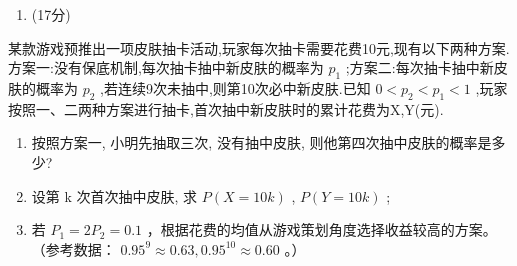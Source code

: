 \documentclass[UTF8,12pt,a4paper]{ctexart}
\renewcommand{\labelenumi}{\arabic{enumi}.}
\providecommand{\tightlist}{%
  \setlength{\itemsep}{0pt}\setlength{\parskip}{0pt}}
\begin{document}
\begin{enumerate}
\def\labelenumi{\arabic{enumi}.}
\setcounter{enumi}{18}
\tightlist
\item
  (17分)
\end{enumerate}

某款游戏预推出一项皮肤抽卡活动,玩家每次抽卡需要花费10元,现有以下两种方案.方案一:没有保底机制,每次抽卡抽中新皮肤的概率为 \(p_{1}\) ;方案二:每次抽卡抽中新皮肤的概率为 \(p_{2}\) ,若连续9次未抽中,则第10次必中新皮肤.已知 \(0<p_{2}<p_{1}<1\) ,玩家按照一、二两种方案进行抽卡,首次抽中新皮肤时的累计花费为X,Y(元).

\begin{enumerate}
\def\labelenumi{(\arabic{enumi})}
\item
  按照方案一, 小明先抽取三次, 没有抽中皮肤, 则他第四次抽中皮肤的概率是多少?
\item
  设第 k 次首次抽中皮肤, 求 \(P(X=10k)\) , \(P(Y=10k)\) ;
\item
  若 \(P_{1} = 2P_{2} = 0.1\) ，根据花费的均值从游戏策划角度选择收益较高的方案。（参考数据： \(0.95^{9} \approx 0.63, 0.95^{10} \approx 0.60\) 。）
\end{enumerate}
\end{document}
